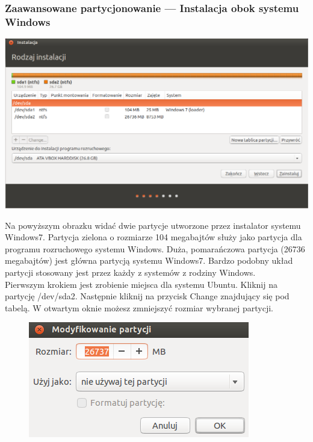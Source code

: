 \subsubsection{Zaawansowane partycjonowanie --- Instalacja obok systemu Windows}
\begin{center}
        \includegraphics[width=\linewidth]{images/instalator_partycjonowanie_gparted2_czysty.png}
\end{center}

Na powyższym obrazku widać dwie partycje utworzone przez instalator systemu Windows7. Partycja zielona o rozmiarze 104 megabajtów służy jako partycja dla programu rozruchowego systemu Windows. Duża, pomarańczowa partycja (26736 megabajtów) jest główna partycją systemu Windows7. Bardzo podobny układ partycji stosowany jest przez każdy z systemów z rodziny Windows.\\
Pierwszym krokiem jest zrobienie miejsca dla systemu Ubuntu. Kliknij na partycję \textcolor{ubuntu_orange}{/dev/sda2}. Następnie kliknij na przycisk \textcolor{ubuntu_orange}{Change} znajdujący się pod tabelą. W otwartym oknie możesz zmniejszyć rozmiar wybranej partycji.
\clearpage
\begin{figure}
                \includegraphics[width=\linewidth]{images/instalator_partycjonowanie_gparted_zmniejszenie_partycji_windows.png}
\end{figure}

